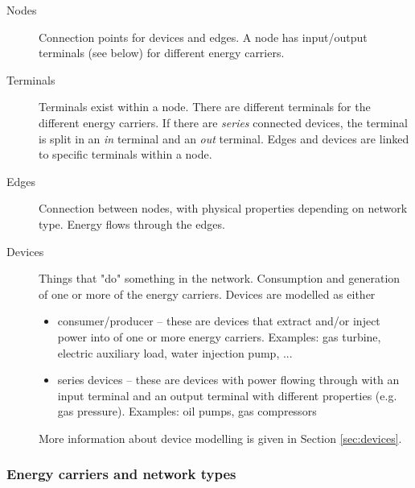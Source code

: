 \documentclass[12pt]{article}
\begin{document}
\begin{description}
\item[Nodes]
Connection points for devices and edges. A node has input/output terminals (see below) for different energy carriers. 

\item[Terminals]
Terminals exist within a node. There are different terminals for the different energy carriers. If there are \textit{series} connected devices, the terminal is split in an \textit{in} terminal and an \textit{out} terminal. Edges and devices are linked to specific terminals within a node.

\item[Edges]
Connection between nodes, with physical properties depending on network type. Energy flows through the edges.

\item[Devices]
Things that "do" something in the network. Consumption and generation of one or more of the energy carriers. Devices are modelled as either
\begin{itemize}
	\item consumer/producer – these are devices that extract and/or inject power into of one or more energy carriers. Examples: gas turbine, electric auxiliary load, water injection pump, ...
	\item series devices – these are devices with power flowing through with an input terminal and an output terminal with different properties (e.g. gas pressure). Examples: oil pumps, gas compressors
\end{itemize}
More information about device modelling is given in Section \ref{sec:devices}.
\end{description}

\subsubsection{Energy carriers and network types}
\end{document}
